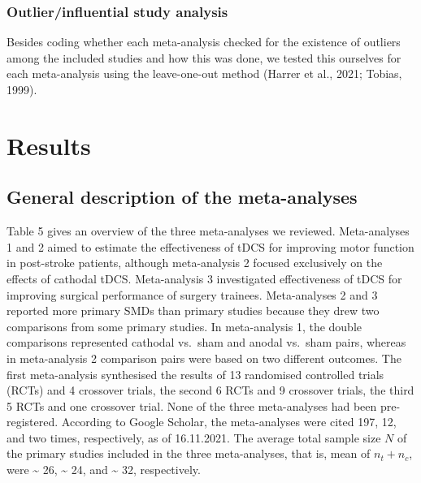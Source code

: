 \documentclass[
  man,floatsintext]{apa6}
\begin{document}
\hypertarget{outlierinfluential-study-analysis}{%
\subsubsection{Outlier/influential study analysis}\label{outlierinfluential-study-analysis}}

Besides coding whether each meta-analysis checked for the existence of outliers among the included studies and how this was done, we tested this ourselves for each meta-analysis using the leave-one-out method (Harrer et al., 2021; Tobias, 1999).

\hypertarget{results}{%
\section{Results}\label{results}}

\hypertarget{general-description-of-the-meta-analyses}{%
\subsection{General description of the meta-analyses}\label{general-description-of-the-meta-analyses}}

Table 5 gives an overview of the three meta-analyses we reviewed. Meta-analyses 1 and 2 aimed to estimate the effectiveness of tDCS for improving motor function in post-stroke patients, although meta-analysis 2 focused exclusively on the effects of cathodal tDCS. Meta-analysis 3 investigated effectiveness of tDCS for improving surgical performance of surgery trainees. Meta-analyses 2 and 3 reported more primary SMDs than primary studies because they drew two comparisons from some primary studies. In meta-analysis 1, the double comparisons represented cathodal vs.~sham and anodal vs.~sham pairs, whereas in meta-analysis 2 comparison pairs were based on two different outcomes. The first meta-analysis synthesised the results of 13 randomised controlled trials (RCTs) and 4 crossover trials, the second 6 RCTs and 9 crossover trials, the third 5 RCTs and one crossover trial. None of the three meta-analyses had been pre-registered. According to Google Scholar, the meta-analyses were cited 197, 12, and two times, respectively, as of 16.11.2021. The average total sample size \(N\) of the primary studies included in the three meta-analyses, that is, mean of \(n_t + n_c\), were \textasciitilde{} 26, \textasciitilde{} 24, and \textasciitilde{} 32, respectively.

\singlespacing
\begingroup\fontsize{11}{13}\selectfont
\end{document}
